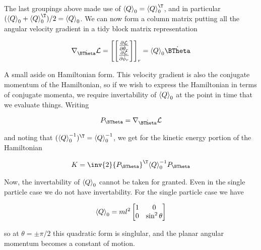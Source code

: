 The last groupings above made use of $\gpgradezero{Q} = \gpgradezero{Q}^\T$, and in particular $(\gpgradezero{Q} + \gpgradezero{Q}^\T)/2 = \gpgradezero{Q}$.  We can now form a column matrix putting all the angular velocity gradient in a tidy block matrix representation

\begin{align}\label{eqn:multiPendulumSpherical2:boo22}
\grad_{\dot{\BTheta}} \LL = 
{\begin{bmatrix}
\begin{bmatrix}
\PD{\dot{\theta}_r}{\LL} \\
\PD{\dot{\phi}_r}{\LL} \\
\end{bmatrix}
\end{bmatrix}}_r = \gpgradezero{Q} \dot{\BTheta}
\end{align}

A small aside on Hamiltonian form.  This velocity gradient is also the conjugate momentum of the Hamiltonian, so if we wish to express the Hamiltonian in terms of conjugate momenta, we require invertability of ${\left\langle{{Q}}\right\rangle}_{0}$ at the point in time that we evaluate things.  Writing

\begin{align}\label{eqn:multiPendulumSpherical2:boo30}
P_{\BTheta} = \grad_{\dot{\BTheta}} \LL 
\end{align}

and noting that $(\gpgradezero{Q}^{-1})^\T = \gpgradezero{Q}^{-1}$, we get for the kinetic energy portion of the Hamiltonian 

\begin{align}\label{eqn:multiPendulumSpherical2:boo31}
K = \inv{2} {P_{\BTheta}}^\T \gpgradezero{Q}^{-1} P_{\BTheta}
\end{align}

Now, the invertability of ${\left\langle{{Q}}\right\rangle}_{0}$ cannot be taken for granted.  Even in the single particle case we do not have invertability.  For the single particle case we have

\begin{align}\label{eqn:multiPendulumSpherical2:boo45}
{\left\langle{{Q}}\right\rangle}_{0} =
m l^2 
\begin{bmatrix}
1 & 0 \\
0 & \sin^2 \theta
\end{bmatrix}
\end{align}

so at $\theta = \pm \pi/2$ this quadratic form is singlular, and the planar angular momentum becomes a constant of motion.

